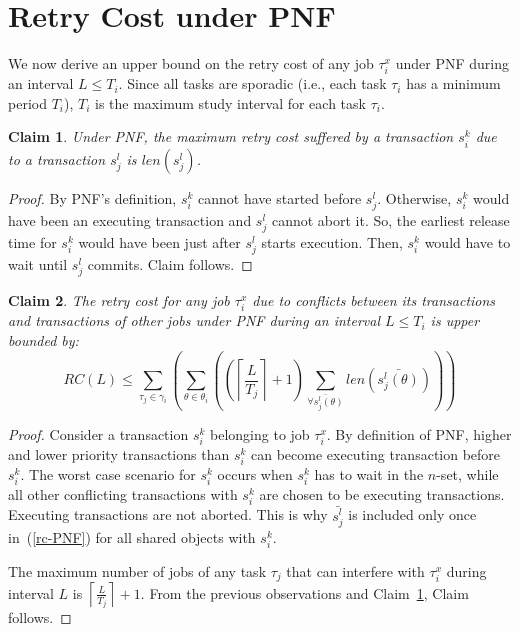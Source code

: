 \documentclass[twocolumn]{article}
\newtheorem{clm}{Claim}
\newtheorem{proof}{Proof}
\begin{document}
\section{Retry Cost under PNF}\label{rc pnf sec}

We now derive an upper bound on the retry cost of any job $\tau_i^x$ under PNF during an interval $L\le T_i$. Since all tasks are sporadic (i.e., each task $\tau_i$ has a minimum period $T_i$), $T_i$ is the maximum study interval for each task $\tau_i$.

\begin{clm}\label{two transactions retry cost PNF}
Under PNF, the maximum retry cost suffered by a transaction $s_{i}^{k}$ due 
to a transaction $s_{j}^{l}$ is $len(s_{j}^{l})$.
\end{clm}
\begin{proof}\normalfont
By PNF's definition, $s_{i}^{k}$ cannot have started before
$s_{j}^{l}$. Otherwise, $s_i^k$ would have been an executing transaction and $s_{j}^{l}$ cannot abort it. So, the earliest release time for $s_{i}^{k}$ would have been just after $s_{j}^{l}$ starts execution. Then, $s_i^k$ would have to wait until $s_{j}^{l}$
commits. Claim follows.
\end{proof}

\begin{clm}
The retry cost for any job $\tau_{i}^{x}$ due to conflicts between its transactions and transactions of other jobs under PNF during an interval $L\le T_{i}$ is upper bounded by:
\begin{equation}
RC(L)\le\sum_{\tau_{j}\in\gamma_{i}}\left(\sum_{\theta\in\theta_{i}}\left(\left(\left\lceil \frac{L}{T_{j}}\right\rceil +1\right)\sum_{\bar{\forall s_{j}^{l}(\theta)}}len\left(\bar{s_{j}^{l}(\theta)}\right)\right)\right)\label{rc-PNF}
\end{equation}
\end{clm}

\begin{proof}\normalfont
Consider a transaction $s_{i}^{k}$ belonging to job $\tau_{i}^{x}$. By definition of PNF, higher and lower priority transactions than $s_i^k$ can become executing transaction before $s_i^k$. 
 The worst case scenario for $s_{i}^{k}$ occurs when $s_i^k$ has to wait in the $n$-set, while all other conflicting transactions with $s_i^k$ are chosen to be executing transactions. Executing transactions are not aborted. This is why $\bar{s_j^l}$ is included only once in~(\ref{rc-PNF}) for all shared objects with $s_i^k$.

The maximum number of jobs of any task $\tau_{j}$ that can interfere with $\tau_{i}^{x}$ during interval $L$ is $\left\lceil \frac{L}{T_{j}}\right\rceil +1$. From  the previous observations and Claim~\ref{two transactions retry cost PNF}, Claim follows.
\end{proof}
\end{document}
